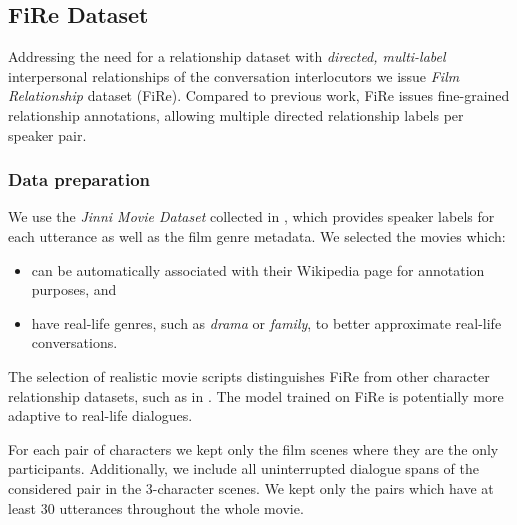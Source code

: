 \subsection{FiRe Dataset}
\label{relatinoship_dataset}

Addressing the need for a relationship dataset with \emph{directed, multi-label} interpersonal relationships of the conversation interlocutors we issue \textit{Film Relationship} dataset (FiRe). Compared to previous work, FiRe issues fine-grained relationship annotations, allowing multiple directed relationship labels per speaker pair.

\subsubsection{Data preparation}
We use the 
\emph{Jinni Movie Dataset}
collected in \citet{gorinski2018s}, which 
provides speaker labels for each utterance as well as the film genre metadata.
We selected the movies which:
\begin{itemize}[topsep=3pt,itemsep=2pt,partopsep=3pt, parsep=3pt]
    \item can be automatically associated with their Wikipedia page for annotation purposes, and
    \item have real-life genres, such as \emph{drama} or \emph{family}, to better approximate real-life conversations.
\end{itemize}
The selection of realistic movie scripts distinguishes FiRe from other character relationship datasets, such as in \citet{jia2020ddrel}. The model trained on FiRe 
is potentially more adaptive
to real-life dialogues.

For each pair of characters we kept only the film scenes where they are the only participants. Additionally, we include all uninterrupted dialogue spans of the considered pair in the 3-character scenes. We kept only the pairs which have at least 30 utterances throughout the whole movie.

